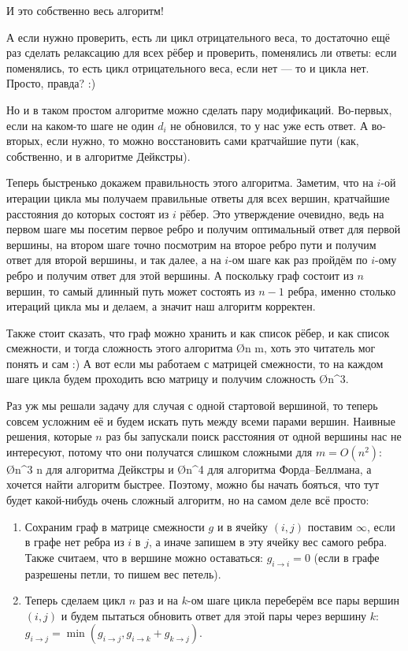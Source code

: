 И это собственно весь алгоритм!

А если нужно проверить, есть ли цикл отрицательного веса, то достаточно ещё раз сделать релаксацию для всех рёбер и проверить, поменялись ли ответы: если поменялись, то есть цикл отрицательного веса, если нет — то и цикла нет. Просто, правда? :)

Но и в таком простом алгоритме можно сделать пару модификаций. Во-первых, если на каком-то шаге не один $d_i$ не обновился, то у нас уже есть ответ. А во-вторых, если нужно, то можно восстановить сами кратчайшие пути (как, собственно, и в алгоритме Дейкстры).

Теперь быстренько докажем правильность этого алгоритма. Заметим, что на $i$-ой итерации цикла мы получаем правильные ответы для всех вершин, кратчайшие расстояния до которых состоят из $i$ рёбер. Это утверждение очевидно, ведь на первом шаге мы посетим первое ребро и получим оптимальный ответ для первой вершины, на втором шаге точно посмотрим на второе ребро пути и получим ответ для второй вершины, и так далее, а на $i$-ом шаге как раз пройдём по $i$-ому ребро и получим ответ для этой вершины. А поскольку граф состоит из $n$ вершин, то самый длинный путь может состоять из $n - 1$ ребра, именно столько итераций цикла мы и делаем, а значит наш алгоритм корректен.

Также стоит сказать, что граф можно хранить и как список рёбер, и как список смежности, и тогда сложность этого алгоритма \O{n m}, хоть это читатель мог понять и сам :) А вот если мы работаем с матрицей смежности, то на каждом шаге цикла будем проходить всю матрицу и получим сложность \O{n^3}.


Раз уж мы решали задачу для случая с одной стартовой вершиной, то теперь совсем усложним её и будем искать путь между всеми парами вершин. Наивные решения, которые $n$ раз бы запускали поиск расстояния от одной вершины нас не интересуют, потому что они получатся слишком сложными для $m = O(n^2)$: \O{n^3 \log n} для алгоритма Дейкстры и \O{n^4} для алгоритма Форда–Беллмана, а хочется найти алгоритм быстрее. Поэтому, можно бы начать бояться, что тут будет какой-нибудь очень сложный алгоритм, но на самом деле всё просто:

\begin{enumerate}
    \item Сохраним граф в матрице смежности $g$ и в ячейку $(i, j)$ поставим $\infty$, если в графе нет ребра из $i$ в $j$, а иначе запишем в эту ячейку вес самого ребра. Также считаем, что в вершине можно оставаться: $g_{i \to i} = 0$ (если в графе разрешены петли, то пишем вес петель).
    \item Теперь сделаем цикл $n$ раз и на $k$-ом шаге цикла переберём все пары вершин $(i, j)$ и будем пытаться обновить ответ для этой пары через вершину $k$: $g_{i \to j} = \min(g_{i \to j}, g_{i \to k} + g_{k \to j})$.
\end{enumerate}

